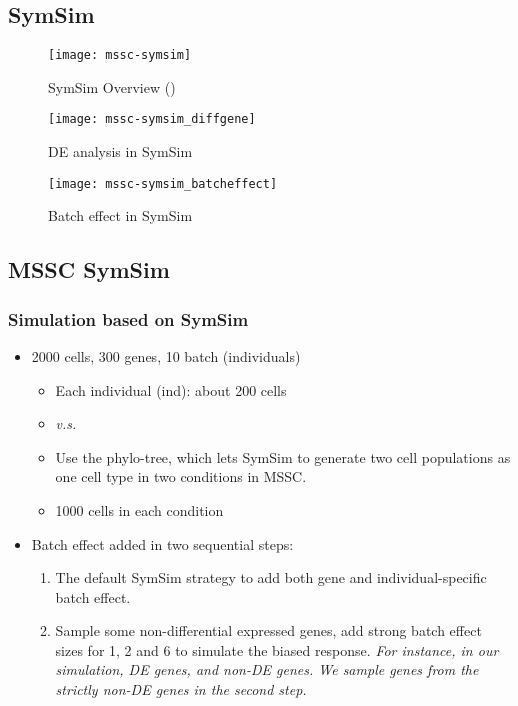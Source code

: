 \subsection{SymSim}
\begin{frame}
  \begin{figure}
    \centering
    \texttt{[image: mssc-symsim]}
    \caption{SymSim Overview (\cite{zhang2019simulating})}
  \end{figure}
\end{frame}

\begin{frame}
  \begin{figure}
    \centering
    \texttt{[image: mssc-symsim\_diffgene]}
    \caption{DE analysis in SymSim}
  \end{figure}
\end{frame}

\begin{frame}
  \begin{figure}
    \centering
    \texttt{[image: mssc-symsim\_batcheffect]}
    \caption{Batch effect in SymSim}
  \end{figure}
\end{frame}

\subsection*{MSSC SymSim}
\begin{frame}
  \frametitle{Simulation based on SymSim}
  \begin{itemize}
  \item
    2000 cells, 300 genes, 10 batch (individuals)
    \begin{itemize}
    \item
      Each individual (ind): about 200 cells
    \item
       {\it v.s.} 
    \item
      Use the  phylo-tree, which lets SymSim to generate two cell populations
      as one cell type in two conditions in MSSC.
    \item
      1000 cells in each condition
    \end{itemize}
  \item
    Batch effect added in two sequential steps:
    \begin{enumerate}
    \item
      The default SymSim strategy to add both gene and
      individual-specific batch effect.
    \item
      Sample some non-differential expressed genes, add strong batch effect
      sizes for 1, 2 and 6 to simulate the biased response. {\it For
        instance, in our simulation,  DE genes, and 
       non-DE genes. We sample  genes from the
      strictly non-DE genes in the second step.} 
    \end{enumerate}
  \end{itemize}
\end{frame}

